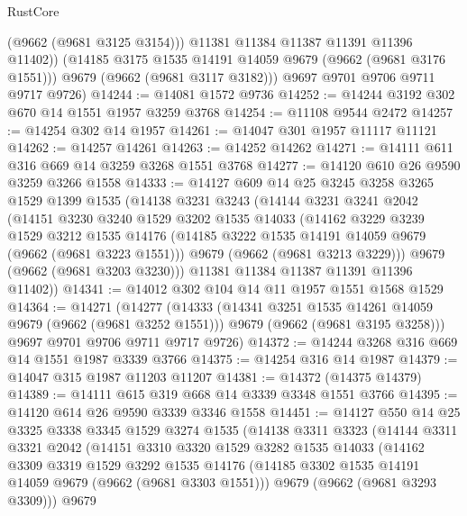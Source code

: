 \begin{lexlean}{RustCore}
\begin{coremodule}
              (@9662 (@9681 @3125 @3154)))
            @11381
            @11384
            @11387
            @11391
            @11396
            @11402))
        (@14185 @3175 @1535 @14191 @14059 @9679 (@9662 (@9681 @3176 @1551)))
        @9679
        (@9662 (@9681 @3117 @3182)))
      @9697
      @9701
      @9706
      @9711
      @9717
      @9726)
@14244 := @14081 @1572 @9736
@14252 := @14244 @3192 @302 @670 @14 @1551 @1957 @3259 @3768
@14254 := @11108 @9544 @2472
@14257 := @14254 @302 @14 @1957
@14261 := @14047 @301 @1957 @11117 @11121
@14262 := @14257 @14261
@14263 := @14252 @14262
@14271 := @14111 @611 @316 @669 @14 @3259 @3268 @1551 @3768
@14277 := @14120 @610 @26 @9590 @3259 @3266 @1558
@14333 := @14127
    @609
    @14
    @25
    @3245
    @3258
    @3265
    @1529
    @1399
    @1535
    (@14138
      @3231
      @3243
      (@14144
        @3231
        @3241
        @2042
        (@14151
          @3230
          @3240
          @1529
          @3202
          @1535
          @14033
          (@14162
            @3229
            @3239
            @1529
            @3212
            @1535
            @14176
            (@14185 @3222 @1535 @14191 @14059 @9679 (@9662 (@9681 @3223 @1551)))
            @9679
            (@9662 (@9681 @3213 @3229)))
          @9679
          (@9662 (@9681 @3203 @3230)))
        @11381
        @11384
        @11387
        @11391
        @11396
        @11402))
@14341 := @14012 @302 @104 @14 @11 @1957 @1551 @1568 @1529
@14364 := @14271
    (@14277
      (@14333
        (@14341 @3251 @1535 @14261 @14059 @9679 (@9662 (@9681 @3252 @1551)))
        @9679
        (@9662 (@9681 @3195 @3258)))
      @9697
      @9701
      @9706
      @9711
      @9717
      @9726)
@14372 := @14244 @3268 @316 @669 @14 @1551 @1987 @3339 @3766
@14375 := @14254 @316 @14 @1987
@14379 := @14047 @315 @1987 @11203 @11207
@14381 := @14372 (@14375 @14379)
@14389 := @14111 @615 @319 @668 @14 @3339 @3348 @1551 @3766
@14395 := @14120 @614 @26 @9590 @3339 @3346 @1558
@14451 := @14127
    @550
    @14
    @25
    @3325
    @3338
    @3345
    @1529
    @3274
    @1535
    (@14138
      @3311
      @3323
      (@14144
        @3311
        @3321
        @2042
        (@14151
          @3310
          @3320
          @1529
          @3282
          @1535
          @14033
          (@14162
            @3309
            @3319
            @1529
            @3292
            @1535
            @14176
            (@14185 @3302 @1535 @14191 @14059 @9679 (@9662 (@9681 @3303 @1551)))
            @9679
            (@9662 (@9681 @3293 @3309)))
          @9679

\end{coremodule}
\end{lexlean}
